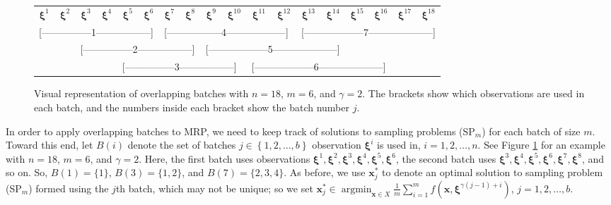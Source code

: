 \documentclass[12pt]{article}
\newcommand{\x}{\mathbf{x}}
\newcommand{\xs}{\x^*}
\newcommand{\xit}{\boldsymbol{\xi}}
\newcommand{\xiti}{\xit^i}
\DeclareMathOperator*{\argmin}{argmin}
\begin{document}
\begin{figure}[tb!]
	\centering
	\begin{tabular}{*{18}{c}}
		$\xit^1$ & $\xit^2$ & $\xit^3$ & $\xit^4$ & $\xit^5$ & $\xit^6$ & $\xit^7$ & $\xit^8$ & $\xit^9$ & $\xit^{10}$ & $\xit^{11}$ & $\xit^{12}$ & $\xit^{13}$ & $\xit^{14}$ & $\xit^{15}$ & $\xit^{16}$ & $\xit^{17}$  & $\xit^{18}$ \\
		\multicolumn{6}{l}{[---------------1-----------------]} &
		\multicolumn{6}{l}{[-----------------4------------------]} &
		\multicolumn{6}{l}{[------------------7--------------------]} \\
		& & \multicolumn{6}{l}{[---------------2-----------------]} &
		\multicolumn{6}{l}{[------------------5--------------------]} \\
		& & & & \multicolumn{6}{l}{[---------------3-----------------]} &
		\multicolumn{6}{l}{[------------------6--------------------]} \\
	\end{tabular}
	\caption{Visual representation of overlapping batches with $n = 18$, $m = 6$, and $\gamma = 2$.  
        The brackets show which observations are used in each batch, and the numbers inside each bracket show the batch number $j$.}
	\label{fig:overlap_nonint}
\end{figure}

In order to apply overlapping batches to MRP, we need to keep track of solutions to sampling problems (SP$_m$) for each batch of size $m$.  
Toward this end, let $B(i)$ denote the set of batches $j \in \left\{1, 2, \dots, b \right\}$ observation $\xiti$ is used in, $i = 1, 2, \dots, n$.  
See Figure \ref{fig:overlap_nonint} for an example with $n=18$, $m = 6$, and $\gamma = 2$.  
Here, the first batch uses observations $\xit^1, \xit^2, \xit^3, \xit^4, \xit^5, \xit^6$, the second batch uses $\xit^3, \xit^4, \xit^5, \xit^6, \xit^7, \xit^8$, and so on.  
So, $B(1) = \{1\}$, $B(3) = \{1,2\}$, and $B(7)=\{2,3,4\}$.  
As before, we use $\xs_j$ to denote an optimal solution to sampling problem (SP$_m$) formed using the $j$th batch, which may not be unique; so we set $\xs_j \in \argmin_{\x \in X} \frac{1}{m} \sum_{i=1}^m f(\x,\xit^{\gamma(j-1) + i})$, $j = 1, 2, \dots, b$. 
\end{document}
